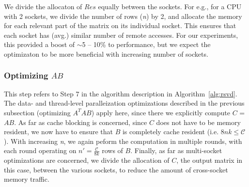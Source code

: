      We divide the allocaton of $Res$ equally between
     the sockets. For e.g., for a CPU with 2 sockets, we divide the
     number of rows ({\it{n}}) by 2, and allocate the memory for each
     relevant part of the matrix on its individual socket. This
     ensures that %
     each socket has (avg.) similar number of
     remote accesses. For our experiments, this
     provided a boost of
     $\sim$5 -- 10\% to performance, but we expect the optimizaton
     to be more beneficial with increasing number of
     sockets.
     
     







    




\subsubsection{Optimizing $AB$}

    This step refers to Step 7 in the algorithm description in
    Algorithm~\ref{alg:rsvd}. The data- and thread-level paralleization optimizations described 
    in the previous subsection (optimizing $A^TAB$) apply here, since
    there we explicitly  compute $C$ = $AB$. As far as cache blocking is
    concerned, since $C$ does not have to be memory resident, we now have
    to ensure that $B$ is completely cache resident (i.e. $8nk\le
    \mathcal{C}$). With increasing {\it{n}}, we again peform the
    computation in multiple rounds, with each round operating on 
    $n'=\frac{\mathcal{C}}{8k}$ rows of $B$.
    Finally, as far as multi-socket optimizations are concerned, we
    divide the allocation of $C$, the output matrix in this case,
    between the various sockets, to reduce the amount of cross-socket
    memory traffic.





